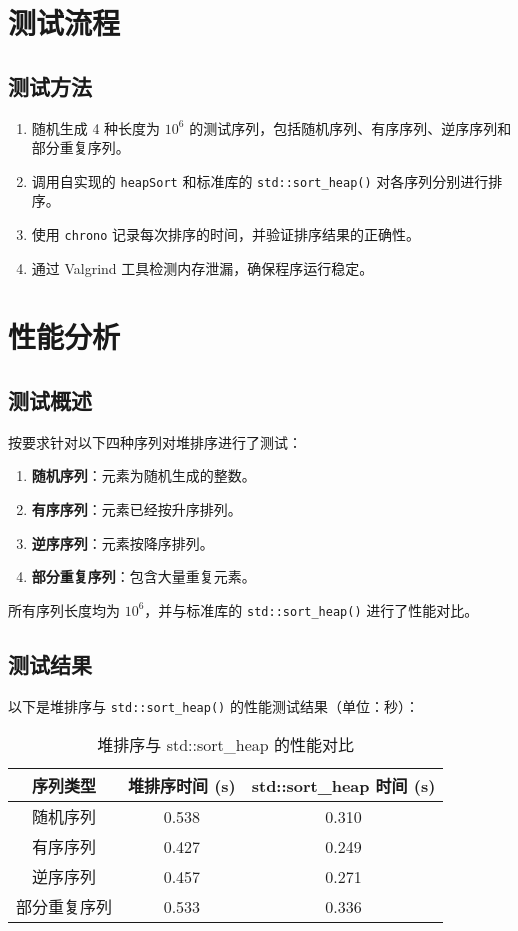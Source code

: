 \documentclass[UTF8]{ctexart}
\begin{document}
\section{测试流程}

\subsection{测试方法}
\begin{enumerate}
    \item 随机生成 4 种长度为 $10^6$ 的测试序列，包括随机序列、有序序列、逆序序列和部分重复序列。
    \item 调用自实现的 \texttt{heapSort} 和标准库的 \texttt{std::sort\_heap()} 对各序列分别进行排序。
    \item 使用 \texttt{chrono} 记录每次排序的时间，并验证排序结果的正确性。
    \item 通过 Valgrind 工具检测内存泄漏，确保程序运行稳定。
\end{enumerate}

\section{性能分析}
\subsection{测试概述}
按要求针对以下四种序列对堆排序进行了测试：
\begin{enumerate}
    \item \textbf{随机序列}：元素为随机生成的整数。
    \item \textbf{有序序列}：元素已经按升序排列。
    \item \textbf{逆序序列}：元素按降序排列。
    \item \textbf{部分重复序列}：包含大量重复元素。
\end{enumerate}

所有序列长度均为 $10^6$，并与标准库的 \texttt{std::sort\_heap()} 进行了性能对比。

\subsection{测试结果}
以下是堆排序与 \texttt{std::sort\_heap()} 的性能测试结果（单位：秒）：
\begin{table}[h!]
    \centering
    \begin{tabular}{|c|c|c|}
    \hline
    \textbf{序列类型} & \textbf{堆排序时间 (s)} & \textbf{std::sort\_heap 时间 (s)} \\ \hline
    随机序列        & 0.538                     & 0.310                             \\ \hline
    有序序列        & 0.427                     & 0.249                             \\ \hline
    逆序序列        & 0.457                     & 0.271                             \\ \hline
    部分重复序列    & 0.533                     & 0.336                             \\ \hline
    \end{tabular}
    \caption{堆排序与 std::sort\_heap 的性能对比}
\end{table}
\end{document}
